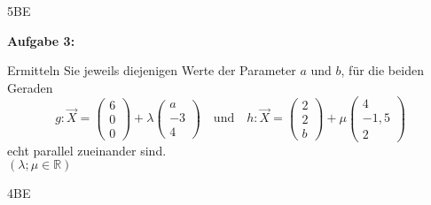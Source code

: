 \documentclass[a4paper,12pt]{article}
\newcommand{\Aufgabe}[1]{
  {
  \vspace*{0.5cm}
  \textsf{\textbf{Aufgabe #1}}
  \vspace*{0.2cm}
  
  }
}
\begin{document}
\begin{flushright}5BE \end{flushright}
\Aufgabe{3:}
Ermitteln Sie jeweils diejenigen Werte der Parameter $a$ und $b$, für die beiden Geraden
\[
  g: \vec{X} = \begin{pmatrix}6 \\ 0 \\ 0 \end{pmatrix} 
                     + \lambda \begin{pmatrix} a \\ -3 \\ 4 \end{pmatrix}
\quad \textrm{und} \quad
  h: \vec{X} = \begin{pmatrix}2 \\ 2 \\ b \end{pmatrix} 
                     + \mu \begin{pmatrix} 4 \\ -1,5 \\ 2 \end{pmatrix}
\]
echt parallel zueinander sind.\\
$
  (\lambda; \mu \in \mathbb{R})
$

\begin{flushright}4BE \end{flushright}

\end{document}
